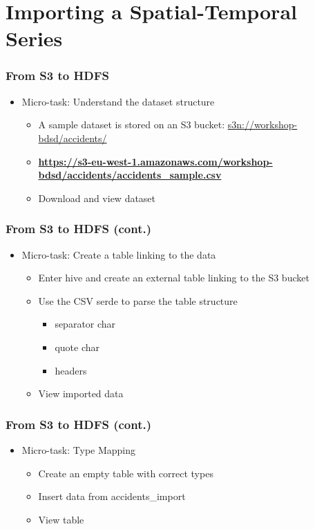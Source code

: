 \documentclass[hyperref={pdfpagelabels=true}]{beamer}
\begin{document}

\section{Importing a Spatial-Temporal Series} 

\begin{frame}
\frametitle{From S3 to HDFS}
\begin{itemize}
  \item<1->Micro-task: Understand the dataset structure
  \begin{itemize}
    \item<1->A sample dataset is stored on an S3 bucket: \url{s3n://workshop-bdsd/accidents/}
    \item<2->\textbf{\url{https://s3-eu-west-1.amazonaws.com/workshop-bdsd/accidents/accidents\_sample.csv}}
    \item<3->Download and view dataset
  \end{itemize}
\end{itemize}
\end{frame}

\begin{frame}
\frametitle{From S3 to HDFS (cont.)}
\begin{itemize}
  \item<1->Micro-task: Create a table linking to the data
  \begin{itemize}
    \item<1->Enter hive and create an external table linking to the S3 bucket
    \item<2->Use the CSV serde to parse the table structure
      \begin{itemize}
	\item<3->separator char
	\item<3->quote char
	\item<3->headers
       \end{itemize}
    \item<4->View imported data       
  \end{itemize}
\end{itemize}
\end{frame}

\begin{frame}
\frametitle{From S3 to HDFS (cont.)}
\begin{itemize}
  \item<1->Micro-task: Type Mapping
  \begin{itemize}
    \item<2->Create an empty table with correct types
    \item<3->Insert data from accidents\_import
    \item<4->View table
  \end{itemize}
\end{itemize}
\end{frame}
\end{document}
